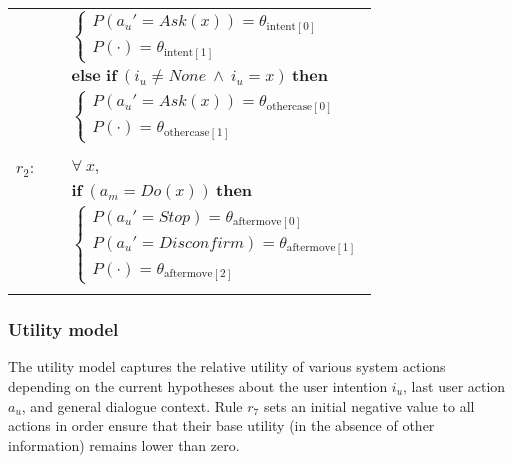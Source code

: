 \begin{footnotesize}
\begin{longtable}{p{2cm}l}
& \;\;\;\;\; $ \begin{cases}P(\mathit{a_u}'\!=\!\mathit{{Ask(x)}})\!=\!\theta_{\mathrm{intent[0]}} \\
P(\cdot)\!=\!\theta_{\mathrm{intent[1]}} \end{cases}$  \vspace{1mm} \\ 
& $ \textbf{else if} \ (\mathit{i_u}\!\neq\!\mathit{None} \ \land \ \mathit{i_u}\!=\!x) \ \textbf{then}$ \\
& \;\;\;\;\; $ \begin{cases}P(\mathit{a_u}'\!=\!\mathit{{Ask(x)}})\!=\!\theta_{\mathrm{othercase[0]}} \\
P(\cdot)\!=\!\theta_{\mathrm{othercase[1]}} \end{cases}$ \\ \\[-1mm]
$r_{2}$: \ \ & $\forall \ x,$ \\
& $ \textbf{if} \ (\mathit{a_m}\!=\!\mathit{Do(x)}) \ \textbf{then} $ \\
 & \;\;\;\;\; $ \begin{cases}P(\mathit{a_u}'\!=\!\mathit{Stop})\!=\!\theta_{\mathrm{aftermove[0]}} \\
P(\mathit{a_u}'\!=\!\mathit{Disconfirm})\!=\!\theta_{\mathrm{aftermove[1]}} \\
P(\cdot)\!=\!\theta_{\mathrm{aftermove[2]}} \end{cases}$ \\ \\[-1mm]
\end{longtable}
\end{footnotesize}


\subsubsection*{Utility model}

The utility model captures the relative utility of various system actions depending on the current hypotheses about the user intention $i_u$, last user action $a_u$, and general dialogue context. Rule $r_7$ sets an initial negative value to all actions in order ensure that their base utility (in the absence of other information) remains lower than zero.

